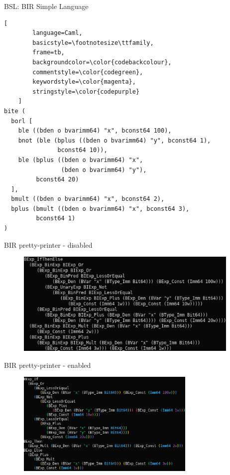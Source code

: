 \documentclass[xcolor={x11names}]{beamer}
\begin{document}
\begin{frame}[fragile]{BSL: BIR Simple Language}
    \begin{lstlisting}[
        language=Caml,
        basicstyle=\footnotesize\ttfamily,
        frame=tb,
        backgroundcolor=\color{codebackcolour},
        commentstyle=\color{codegreen},
        keywordstyle=\color{magenta},
        stringstyle=\color{codepurple}
    ]
bite (
  borl [
    ble ((bden o bvarimm64) "x", bconst64 100),
    bnot (ble (bplus ((bden o bvarimm64) "y", bconst64 1),
               bconst64 10)),
    ble (bplus ((bden o bvarimm64) "x",
                (bden o bvarimm64) "y"),
         bconst64 20)
  ],
  bmult ((bden o bvarimm64) "x", bconst64 2),
  bplus (bmult ((bden o bvarimm64) "x", bconst64 3),
         bconst64 1)
)
    \end{lstlisting}
\end{frame}

\begin{frame}{BIR pretty-printer - disabled}
    \begin{figure}
        \centering
        \includegraphics[height=5cm]{../figures/pp_ex_default_printing.png}
    \end{figure}
\end{frame}

\begin{frame}{BIR pretty-printer - enabled}
    \begin{figure}
        \centering
        \includegraphics[height=5cm]{../figures/pp_ex_pretty_printing.png}
    \end{figure}
\end{frame}
\end{document}
